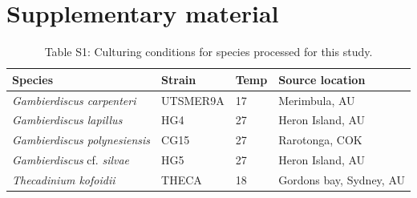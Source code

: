\documentclass[12pt]{article}
\begin{document}
\section{Supplementary material}
\FloatBarrier
\begin{table}
\caption{Table S1: Culturing conditions for species processed for this study.}
\begin{tabular}{ | p{3cm} | p{2.5cm} | p{1.5cm} | p{5.3cm} |}
\hline
\textbf{Species} & \textbf{Strain}& \textbf{Temp} & \textbf{Source location} \\
\hline
\textit{Gambierdiscus carpenteri}&UTSMER9A&17&Merimbula, AU\\
\hline
\textit{Gambierdiscus lapillus}&HG4&27&Heron Island, AU\\
\hline
\textit{Gambierdiscus polynesiensis}&CG15&27&Rarotonga, COK\\
\hline
\textit{Gambierdiscus} cf. \textit{silvae}&HG5&27&Heron Island, AU\\
\hline
\textit{Thecadinium kofoidii}&THECA&18&Gordons bay, Sydney, AU\\
\hline
\end{tabular}
\end{table}
\FloatBarrier
\end{document}
